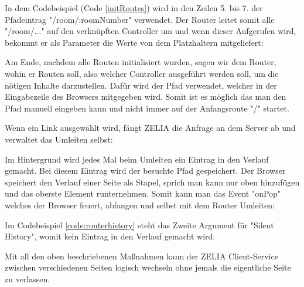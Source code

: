 
In dem Codebeispiel (Code \ref{initRoutes}) wird in den Zeilen 5. bis 7. der Pfadeintrag "/room/:roomNumber" verwendet. Der Router leitet somit alle "/room/..." auf den verknüpften Controller um und wenn dieser Aufgerufen wird, bekommt er als Parameter die Werte von dem Platzhaltern mitgeliefert:


Am Ende, nachdem alle Routen initialisiert wurden, sagen wir dem Router, wohin er Routen soll, also welcher Controller ausgeführt werden soll, um die nötigen Inhalte darzustellen. Dafür wird der Pfad verwendet, welcher in der Eingabezeile des Browsers mitgegeben wird. Somit ist es möglich das man den Pfad manuell eingeben kann und nicht immer auf der Anfangsroute "/" startet.

Wenn ein Link ausgewählt wird, fängt ZELIA die Anfrage an dem Server ab und verwaltet das Umleiten selbst:


Im  Hintergrund wird jedes Mal beim Umleiten ein Eintrag in den Verlauf gemacht. Bei diesem Eintrag wird der besuchte Pfad gespeichert. Der Browser speichert den Verlauf einer Seite als Stapel, sprich man kann nur oben hinzufügen und das oberste Element runternehmen. Somit kann man das Event "onPop" welches der Browser feuert, abfangen und selbst mit dem Router Umleiten:


Im Codebeispiel \ref{code:routerhistory} steht das Zweite Argument für "Silent History", womit kein Eintrag in den Verlauf gemacht wird.

Mit all den oben beschriebenen Maßnahmen kann der ZELIA Client-Service zwischen verschiedenen Seiten logisch wechseln ohne jemals die eigentliche Seite zu verlassen.

